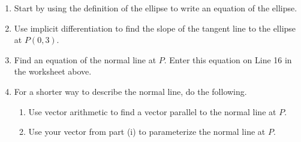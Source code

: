 \documentclass{ximera}
\begin{document}
\begin{question}
\begin{enumerate}
\item Start by using the definition of the ellipse to write an equation of the ellipse.

\item Use implicit differentiation to find the slope of the tangent line to the ellipse at $P(0,3)$.

\item Find an equation of the normal line at $P$. Enter this equation on Line 16 in the worksheet above. 

\item For a shorter way to describe the normal line, do the following.

\begin{enumerate}
\item Use vector arithmetic to find a vector parallel to the normal line at $P$.

\item Use your vector from part (i) to parameterize the normal line at $P$.

\end{enumerate}
\end{enumerate}
\end{question}
\end{document}
